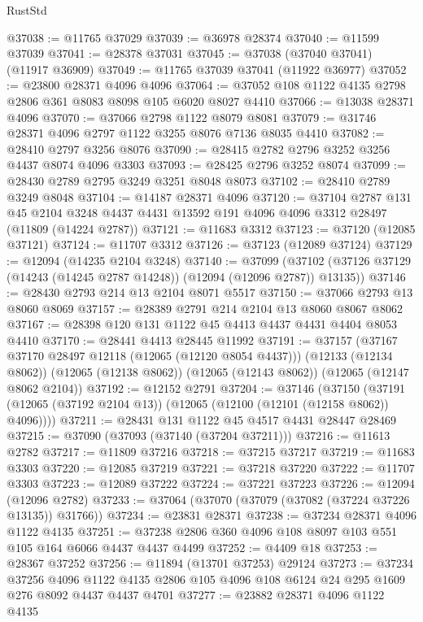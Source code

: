 \begin{lexlean}{RustStd}
\begin{coremodule}
@37038 := @11765 @37029
@37039 := @36978 @28374
@37040 := @11599 @37039
@37041 := @28378 @37031
@37045 := @37038 (@37040 @37041) (@11917 @36909)
@37049 := @11765 @37039 @37041 (@11922 @36977)
@37052 := @23800 @28371 @4096 @4096
@37064 := @37052 @108 @1122 @4135 @2798 @2806 @361 @8083 @8098 @105 @6020 @8027 @4410
@37066 := @13038 @28371 @4096
@37070 := @37066 @2798 @1122 @8079 @8081
@37079 := @31746 @28371 @4096 @2797 @1122 @3255 @8076 @7136 @8035 @4410
@37082 := @28410 @2797 @3256 @8076
@37090 := @28415 @2782 @2796 @3252 @3256 @4437 @8074 @4096 @3303
@37093 := @28425 @2796 @3252 @8074
@37099 := @28430 @2789 @2795 @3249 @3251 @8048 @8073
@37102 := @28410 @2789 @3249 @8048
@37104 := @14187 @28371 @4096
@37120 := @37104
    @2787
    @131
    @45
    @2104
    @3248
    @4437
    @4431
    @13592
    @191
    @4096
    @4096
    @3312
    @28497
    (@11809 (@14224 @2787))
@37121 := @11683 @3312
@37123 := @37120 (@12085 @37121)
@37124 := @11707 @3312
@37126 := @37123 (@12089 @37124)
@37129 := @12094 (@14235 @2104 @3248)
@37140 := @37099
    (@37102 (@37126 @37129 (@14243 (@14245 @2787 @14248)) (@12094 (@12096 @2787)) @13135))
@37146 := @28430 @2793 @214 @13 @2104 @8071 @5517
@37150 := @37066 @2793 @13 @8060 @8069
@37157 := @28389 @2791 @214 @2104 @13 @8060 @8067 @8062
@37167 := @28398 @120 @131 @1122 @45 @4413 @4437 @4431 @4404 @8053 @4410
@37170 := @28441 @4413 @28445 @11992
@37191 := @37157
    (@37167 @37170 @28497 @12118 (@12065 (@12120 @8054 @4437)))
    (@12133 (@12134 @8062))
    (@12065 (@12138 @8062))
    (@12065 (@12143 @8062))
    (@12065 (@12147 @8062 @2104))
@37192 := @12152 @2791
@37204 := @37146
    (@37150 (@37191 (@12065 (@37192 @2104 @13)) (@12065 (@12100 (@12101 (@12158 @8062)) @4096))))
@37211 := @28431 @131 @1122 @45 @4517 @4431 @28447 @28469
@37215 := @37090 (@37093 (@37140 (@37204 @37211)))
@37216 := @11613 @2782
@37217 := @11809 @37216
@37218 := @37215 @37217
@37219 := @11683 @3303
@37220 := @12085 @37219
@37221 := @37218 @37220
@37222 := @11707 @3303
@37223 := @12089 @37222
@37224 := @37221 @37223
@37226 := @12094 (@12096 @2782)
@37233 := @37064 (@37070 (@37079 (@37082 (@37224 @37226 @13135)) @31766))
@37234 := @23831 @28371
@37238 := @37234 @28371 @4096 @1122 @4135
@37251 := @37238 @2806 @360 @4096 @108 @8097 @103 @551 @105 @164 @6066 @4437 @4437 @4499
@37252 := @4409 @18
@37253 := @28367 @37252
@37256 := @11894 (@13701 @37253) @29124
@37273 := @37234
    @37256
    @4096
    @1122
    @4135
    @2806
    @105
    @4096
    @108
    @6124
    @24
    @295
    @1609
    @276
    @8092
    @4437
    @4437
    @4701
@37277 := @23882 @28371 @4096 @1122 @4135

\end{coremodule}
\end{lexlean}
